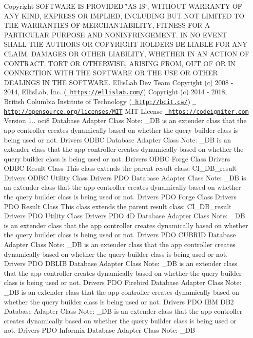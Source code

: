 \begin{DoxyCopyright}{Copyright}
S\+O\+F\+T\+W\+A\+RE IS P\+R\+O\+V\+I\+D\+ED \char`\"{}\+A\+S I\+S\char`\"{}, W\+I\+T\+H\+O\+UT W\+A\+R\+R\+A\+N\+TY OF A\+NY K\+I\+ND, E\+X\+P\+R\+E\+SS OR I\+M\+P\+L\+I\+ED, I\+N\+C\+L\+U\+D\+I\+NG B\+UT N\+OT L\+I\+M\+I\+T\+ED TO T\+HE W\+A\+R\+R\+A\+N\+T\+I\+ES OF M\+E\+R\+C\+H\+A\+N\+T\+A\+B\+I\+L\+I\+TY, F\+I\+T\+N\+E\+SS F\+OR A P\+A\+R\+T\+I\+C\+U\+L\+AR P\+U\+R\+P\+O\+SE A\+ND N\+O\+N\+I\+N\+F\+R\+I\+N\+G\+E\+M\+E\+NT. IN NO E\+V\+E\+NT S\+H\+A\+LL T\+HE A\+U\+T\+H\+O\+RS OR C\+O\+P\+Y\+R\+I\+G\+HT H\+O\+L\+D\+E\+RS BE L\+I\+A\+B\+LE F\+OR A\+NY C\+L\+A\+IM, D\+A\+M\+A\+G\+ES OR O\+T\+H\+ER L\+I\+A\+B\+I\+L\+I\+TY, W\+H\+E\+T\+H\+ER IN AN A\+C\+T\+I\+ON OF C\+O\+N\+T\+R\+A\+CT, T\+O\+RT OR O\+T\+H\+E\+R\+W\+I\+SE, A\+R\+I\+S\+I\+NG F\+R\+OM, O\+UT OF OR IN C\+O\+N\+N\+E\+C\+T\+I\+ON W\+I\+TH T\+HE S\+O\+F\+T\+W\+A\+RE OR T\+HE U\+SE OR O\+T\+H\+ER D\+E\+A\+L\+I\+N\+GS IN T\+HE S\+O\+F\+T\+W\+A\+RE.  Ellis\+Lab Dev Team  Copyright (c) 2008 -\/ 2014, Ellis\+Lab, Inc. (\href{https://ellislab.com/}{\texttt{ https\+://ellislab.\+com/}})  Copyright (c) 2014 -\/ 2018, British Columbia Institute of Technology (\href{http://bcit.ca/}{\texttt{ http\+://bcit.\+ca/}})  \href{http://opensource.org/licenses/MIT}{\texttt{ http\+://opensource.\+org/licenses/\+M\+IT}} M\+IT License  \href{https://codeigniter.com}{\texttt{ https\+://codeigniter.\+com}}  Version 1..  oci8 Database Adapter Class Note\+: \+\_\+\+DB is an extender class that the app controller creates dynamically based on whether the query builder class is being used or not.  Drivers O\+D\+BC Database Adapter Class Note\+: \+\_\+\+DB is an extender class that the app controller creates dynamically based on whether the query builder class is being used or not.  Drivers O\+D\+BC Forge Class  Drivers O\+D\+BC Result Class This class extends the parent result class\+: C\+I\+\_\+\+D\+B\+\_\+result  Drivers O\+D\+BC Utility Class  Drivers P\+DO Database Adapter Class Note\+: \+\_\+\+DB is an extender class that the app controller creates dynamically based on whether the query builder class is being used or not.  Drivers P\+DO Forge Class  Drivers P\+DO Result Class This class extends the parent result class\+: C\+I\+\_\+\+D\+B\+\_\+result  Drivers P\+DO Utility Class  Drivers P\+DO 4D Database Adapter Class Note\+: \+\_\+\+DB is an extender class that the app controller creates dynamically based on whether the query builder class is being used or not.  Drivers P\+DO C\+U\+B\+R\+ID Database Adapter Class Note\+: \+\_\+\+DB is an extender class that the app controller creates dynamically based on whether the query builder class is being used or not.  Drivers P\+DO D\+B\+L\+IB Database Adapter Class Note\+: \+\_\+\+DB is an extender class that the app controller creates dynamically based on whether the query builder class is being used or not.  Drivers P\+DO Firebird Database Adapter Class Note\+: \+\_\+\+DB is an extender class that the app controller creates dynamically based on whether the query builder class is being used or not.  Drivers P\+DO I\+BM D\+B2 Database Adapter Class Note\+: \+\_\+\+DB is an extender class that the app controller creates dynamically based on whether the query builder class is being used or not.  Drivers P\+DO Informix Database Adapter Class Note\+: \+\_\+\+DB 
\end{DoxyCopyright}
